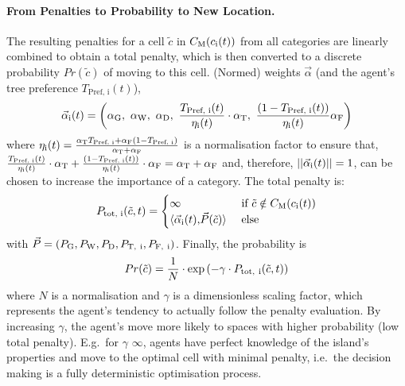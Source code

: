 \paragraph{From Penalties to Probability to New Location.}
The resulting penalties for a cell $\tilde{c}$ in $C_{\rm M}(c_{\rm i}(t))$ from all categories are linearly combined to obtain a total penalty, which is then converted to a discrete probability $Pr(\tilde{c})$ of moving to this cell.
(Normed) weights $\vec{\alpha}$ (and the agent's tree preference $T_\text{Pref, i}(t)$), 
\begin{equation}\label{eq:vecalpha}
\vec{\alpha}_{\rm i} (t) = \left(\alpha_{\rm G},\  \alpha_{\rm W}, \ \alpha_{\rm D}, \  \frac{T_\text{Pref, i}(t)}{\eta_{\rm i}(t)} \cdot \alpha_{\rm T}, \ \frac{(1-T_\text{Pref, i}(t))}{\eta_{\rm i}(t)} \alpha_{\rm F}\right)
\end{equation} 
where $\eta_{\rm i}(t) = \frac{\alpha_{\rm T} T_\text{Pref, i}+ \alpha_{\rm F} (1-T_\text{Pref, i})}{\alpha_{\rm T}+\alpha_{\rm F}}$ is a normalisation factor to ensure that, $\frac{T_\text{Pref, i}(t)}{\eta_{\rm i}(t)}\cdot \alpha_{\rm T} + \frac{(1-T_\text{Pref, i}(t))}{\eta_{\rm i}(t)} \cdot \alpha_{\rm F} = \alpha_{\rm T}+ \alpha_{\rm F}$ and, therefore, $||\vec{\alpha}_{\rm i} (t)||=1$, can be chosen to increase the importance of a category. 
The total penalty is:
\begin{equation}
P_\text{tot, i}(\tilde{c}, t) =  \begin{cases} \infty & \text{ if } \tilde{c}\notin C_{\rm M}(c_{\rm i}(t))\\
	 \langle \vec{\alpha}_{\rm i} (t){, } \vec{P} (\tilde{c}) \rangle &  \text{ else}
	 \end{cases}
\end{equation}
with $\vec{P} = (P_{\rm G}, P_{\rm W}, P_{\rm D}, P_{\rm T, \ i}, P_{\rm F, \ i})$.
Finally, the probability is  
\begin{equation}
	Pr(\tilde{c})  = \frac{1}{N} \cdot \exp \left( - \gamma \cdot P_{\rm tot,\ i}(\tilde{c}, t) \right) 
\end{equation}
where $N$ is a normalisation and $\gamma$ is a dimensionless scaling factor, which represents the agent's tendency to actually follow the penalty evaluation. 
By increasing $\gamma$, the agent's move more likely to spaces with higher probability (low total penalty). 
E.g.\ for $\gamma$ \ra $\infty$, agents have perfect knowledge of the island's properties and move to the optimal cell with minimal penalty, i.e.\ the decision making is a fully deterministic optimisation process\footnotemark.
